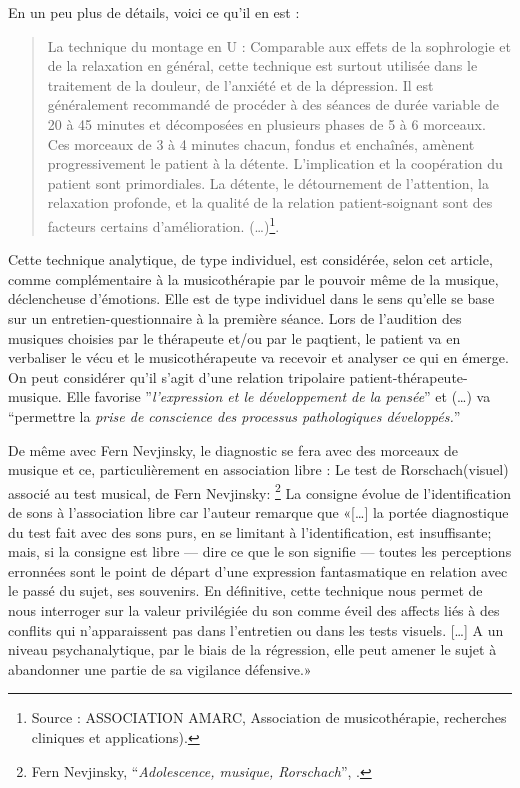 En un peu plus de détails, voici ce qu'il en est :
\begin{quotation}
La technique du montage en U : Comparable aux effets de la sophrologie
et de la relaxation en général, cette technique est surtout utilisée
dans le traitement de la douleur, de l'anxiété et de la dépression. Il
est généralement recommandé de procéder à des séances de durée
variable de 20 à 45 minutes et décomposées en plusieurs phases de 5 à
6 morceaux. Ces morceaux de 3 à 4 minutes chacun, fondus et enchaînés,
amènent progressivement le patient à la détente. L'implication et la
coopération du patient sont primordiales. La détente, le détournement
de l'attention, la relaxation profonde, et la qualité de la relation
patient-soignant sont des facteurs certains
d'amélioration. (\ldots)\footnote{Source : ASSOCIATION AMARC,
  Association de musicothérapie, recherches cliniques et
  applications). }.
\end{quotation}

Cette technique analytique, de type individuel, est considérée, selon
cet article, comme complémentaire à la musicothérapie par le pouvoir
même de la musique, déclencheuse d'émotions. Elle est de type individuel
dans le sens qu'elle se base sur un entretien-questionnaire à la première
séance. Lors de l'audition des musiques choisies par le thérapeute
et/ou par le paqtient, le patient va en verbaliser le vécu et le musicothérapeute
va recevoir et analyser ce qui en émerge. On peut considérer qu'il
s'agit d'une relation tripolaire patient-thérapeute-musique. Elle
favorise ''\emph{l'expression et le développement
de la pensée}'' et (\ldots) va ``permettre la \emph{prise de conscience
des processus pathologiques développés.}''

De même avec Fern Nevjinsky, le diagnostic se fera avec des morceaux
de musique et ce, particulièrement en association libre : 
 Le test de Rorschach(visuel) associé au test musical, de Fern Nevjinsky:
\footnote{Fern Nevjinsky, ``\emph{Adolescence, musique, Rorschach}'',
  \cite{Nevjinsky1996}.} La consigne évolue de l'identification de
sons à l'association libre car l'auteur remarque que  «[\ldots] la
portée diagnostique du test fait avec des sons purs, en se limitant à
l'identification, est insuffisante; mais, si la consigne est libre ---
dire ce que le son signifie --- toutes les perceptions erronnées sont
le point de départ d'une expression fantasmatique en relation avec le
passé du sujet, ses souvenirs. En définitive, cette technique nous
permet de nous interroger sur la valeur privilégiée du son comme éveil
des affects liés à des conflits qui n'apparaissent pas dans
l'entretien ou dans les tests visuels.  [\ldots] A un niveau
psychanalytique, par le biais de la régression, elle peut amener le
sujet à abandonner une partie de sa vigilance défensive.»


